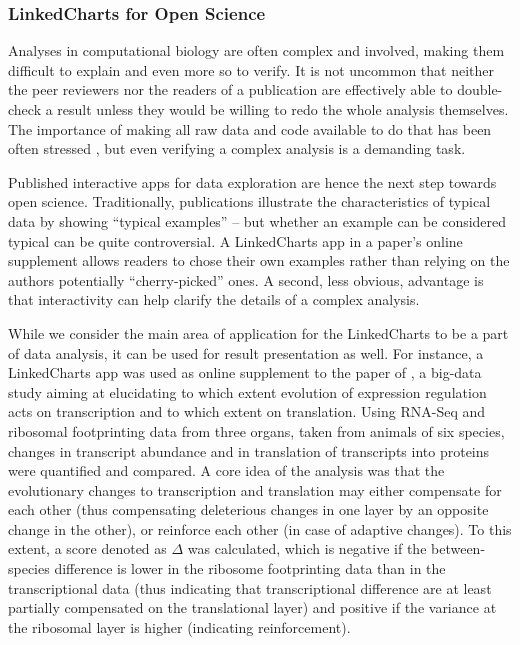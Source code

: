 \documentclass[twocolumn,10pt]{article}
\begin{document}
\subsubsection{LinkedCharts for Open Science}

Analyses in computational biology are often complex and involved, making them difficult to explain and even more so to verify. It is not uncommon that neither the peer reviewers nor the readers of a publication are effectively able to double-check a result unless they would be willing to redo the whole analysis themselves. The importance of making all raw data and code available to do that has been often stressed \citep{gentleman_2005}, but even verifying a complex analysis is a demanding task.

Published interactive apps for data exploration are hence the next step towards open science. Traditionally, publications illustrate the characteristics of typical data by showing ``typical examples'' -- but whether an example can be considered typical can be quite controversial. A LinkedCharts app in a paper's online supplement allows readers to chose their own examples rather than relying on the authors potentially ``cherry-picked'' ones. A second, less obvious, advantage is that interactivity can help clarify the details of a complex analysis.

While we consider the main area of application for the LinkedCharts to be a part of data analysis, it can be used for result presentation as well. For instance, a LinkedCharts app was used as online supplement to the paper of \citet{wang_2020}, a big-data study aiming at elucidating to which extent evolution of expression regulation acts on transcription and to which extent on translation. Using RNA-Seq and ribosomal footprinting data from three organs, taken from animals of six species, changes in transcript abundance and in translation of transcripts into proteins were quantified and compared. A core idea of the analysis was that the evolutionary changes to transcription and translation may either compensate for each other  (thus compensating deleterious changes in one layer by an opposite change in the other), or reinforce each other (in case of adaptive changes). To this extent, a score denoted as $\Delta$ was calculated, which is negative if the between-species difference is lower in the ribosome footprinting data than in the transcriptional data (thus indicating that transcriptional difference are at least partially compensated on the translational layer) and positive if the variance at the ribosomal layer is higher (indicating reinforcement).
\end{document}
